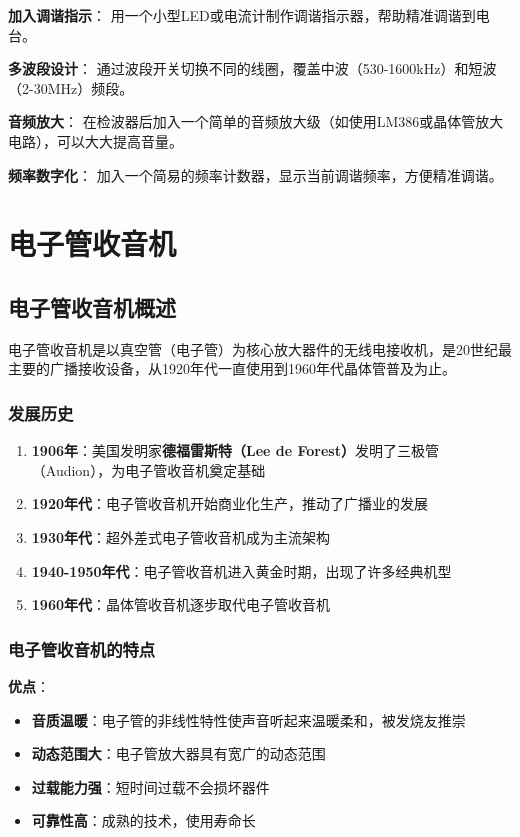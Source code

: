 \textbf{加入调谐指示}：
用一个小型LED或电流计制作调谐指示器，帮助精准调谐到电台。

\textbf{多波段设计}：
通过波段开关切换不同的线圈，覆盖中波（530-1600kHz）和短波（2-30MHz）频段。

\textbf{音频放大}：
在检波器后加入一个简单的音频放大级（如使用LM386或晶体管放大电路），可以大大提高音量。

\textbf{频率数字化}：
加入一个简易的频率计数器，显示当前调谐频率，方便精准调谐。

\section{电子管收音机}
\label{sec:tube_radio}

\subsection{电子管收音机概述}
\label{sec:tube_radio_introduction}

电子管收音机是以真空管（电子管）为核心放大器件的无线电接收机，是20世纪最主要的广播接收设备，从1920年代一直使用到1960年代晶体管普及为止。

\subsubsection{发展历史}
\label{sec:tube_radio_history}

\begin{enumerate}
    \item \textbf{1906年}：美国发明家\textbf{德福雷斯特（Lee de Forest）}发明了三极管（Audion），为电子管收音机奠定基础
    \item \textbf{1920年代}：电子管收音机开始商业化生产，推动了广播业的发展
    \item \textbf{1930年代}：超外差式电子管收音机成为主流架构
    \item \textbf{1940-1950年代}：电子管收音机进入黄金时期，出现了许多经典机型
    \item \textbf{1960年代}：晶体管收音机逐步取代电子管收音机
\end{enumerate}

\subsubsection{电子管收音机的特点}
\label{sec:tube_radio_features}

\textbf{优点}：
\begin{itemize}
    \item \textbf{音质温暖}：电子管的非线性特性使声音听起来温暖柔和，被发烧友推崇
    \item \textbf{动态范围大}：电子管放大器具有宽广的动态范围
    \item \textbf{过载能力强}：短时间过载不会损坏器件
    \item \textbf{可靠性高}：成熟的技术，使用寿命长
\end{itemize}

